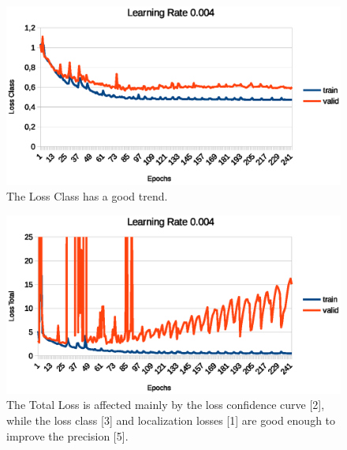 \documentclass[10pt,twocolumn,letterpaper]{article}
\begin{document}
\begin{figure}[t]
\begin{center}
   \includegraphics[width=1\linewidth]{loss_class.eps}
\end{center}
   \caption{The Loss Class has a good trend.}
\label{fig:long}
\label{fig:onecol}
\end{figure}

\begin{figure}[t]
\begin{center}
   \includegraphics[width=1\linewidth]{loss_total.eps}
\end{center}
   \caption{The Total Loss is affected mainly by the loss confidence curve [2], 
while the loss class [3] and localization losses [1] are good enough to improve the precision [5].}
\label{fig:long}
\label{fig:onecol}
\end{figure}
\end{document}
